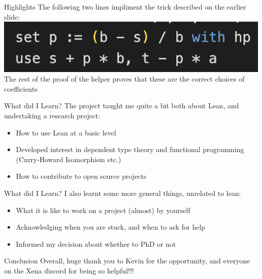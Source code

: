\documentclass[presentation]{beamer}
\begin{document}
\begin{frame}{Highlights}
    The following two lines impliment the trick described on the earlier slide:
    \includegraphics[width=\textwidth]{UROP presentation/Question9helperproof.png}
    \pause
    The rest of the proof of the helper proves that these are the correct choices of coefficients
\end{frame}



\begin{frame}{What did I Learn?}
    The project taught me quite a bit both about Lean, and undertaking a research project:
    \pause
    \begin{itemize}
        \item How to use Lean at a basic level
        \pause
        \item Developed interest in dependent type theory and functional programming (Curry-Howard Isomorphism etc.)
        \pause
        \item How to contribute to open source projects
    \end{itemize}
\end{frame}

\begin{frame}{What did I Learn?}
    I also learnt some more general things, unrelated to lean:
    \pause
    \begin{itemize}
        \item What it is like to work on a project (almost) by yourself
        \pause
        \item Acknowledging when you are stuck, and when to ask for help 
        \pause
        \item Informed my decision about whether to PhD or not 
    \end{itemize}
\end{frame}


\begin{frame}{Conclusion}
    Overall, huge thank you to Kevin for the opportunity, and everyone on the Xena discord for being so helpful!!!
    
\end{frame}
\end{document}
